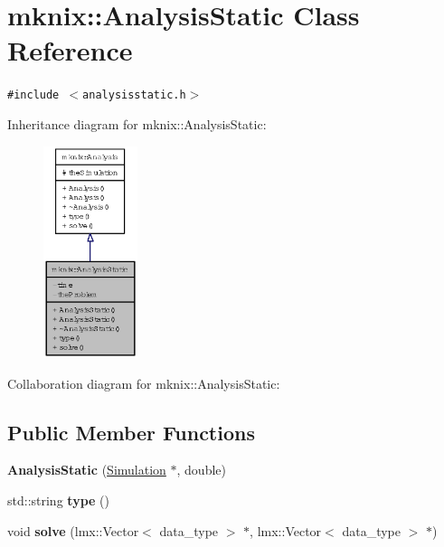 \hypertarget{classmknix_1_1AnalysisStatic}{
\section{mknix::AnalysisStatic Class Reference}
\label{classmknix_1_1AnalysisStatic}
}
{\tt \#include $<$analysisstatic.h$>$}

Inheritance diagram for mknix::AnalysisStatic:\nopagebreak
\begin{figure}[H]
\begin{center}
\leavevmode
\includegraphics[width=78pt]{classmknix_1_1AnalysisStatic__inherit__graph}
\end{center}
\end{figure}
Collaboration diagram for mknix::AnalysisStatic:\subsection*{Public Member Functions}
\begin{CompactItemize}
\item 
\hypertarget{classmknix_1_1AnalysisStatic_18cfe64c3b4b6b3f54acc3caa6780e92}{
\textbf{AnalysisStatic} (\hyperlink{classmknix_1_1Simulation}{Simulation} $\ast$, double)}
\label{classmknix_1_1AnalysisStatic_18cfe64c3b4b6b3f54acc3caa6780e92}

\item 
\hypertarget{classmknix_1_1AnalysisStatic_14ab31bf7d144b576cbc7ea8de0d4fd9}{
std::string \textbf{type} ()}
\label{classmknix_1_1AnalysisStatic_14ab31bf7d144b576cbc7ea8de0d4fd9}

\item 
\hypertarget{classmknix_1_1AnalysisStatic_1f2d048b8625d58f820a7f7d8dfe2f7d}{
void \textbf{solve} (lmx::Vector$<$ data\_\-type $>$ $\ast$, lmx::Vector$<$ data\_\-type $>$ $\ast$)}
\label{classmknix_1_1AnalysisStatic_1f2d048b8625d58f820a7f7d8dfe2f7d}

\end{CompactItemize}


